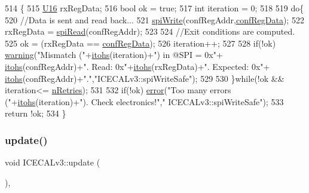 \begin{DoxyCode}
514 \{
515     \hyperlink{ICECALv3_8h_adf928e51a60dba0df29d615401cc55a8}{U16} rxRegData;
516     \textcolor{keywordtype}{bool} ok = \textcolor{keyword}{true};
517     \textcolor{keywordtype}{int} iteration = 0;
518 
519     \textcolor{keywordflow}{do}\{
520         \textcolor{comment}{//Data is sent and read back...}
521         \hyperlink{classICECALv3_aef00f02801dea4bda2093c930501dcdd}{spiWrite}(confRegAddr,\hyperlink{structconfRegData}{confRegData});   
522         rxRegData = \hyperlink{classICECALv3_aced41ce20a0853d6248b8df88412e57a}{spiRead}(confRegAddr);
523 
524         \textcolor{comment}{//Exit conditions are computed.}
525         ok = (rxRegData == \hyperlink{structconfRegData}{confRegData});
526         iteration++;
527     
528         \textcolor{keywordflow}{if}(!ok) \hyperlink{classObject_a65cd4fda577711660821fd2cd5a3b4c9}{warning}(\textcolor{stringliteral}{"Mismatch ("}+\hyperlink{classICECALv3_a04b02e583f191bfce34d05132cd23834}{itohs}(iteration)+\textcolor{stringliteral}{") in @SPI = 0x"}+
      \hyperlink{classICECALv3_a04b02e583f191bfce34d05132cd23834}{itohs}(confRegAddr)+\textcolor{stringliteral}{". Read: 0x"}+\hyperlink{classICECALv3_a04b02e583f191bfce34d05132cd23834}{itohs}(rxRegData)+\textcolor{stringliteral}{". Expected: 0x"}+
      \hyperlink{classICECALv3_a04b02e583f191bfce34d05132cd23834}{itohs}(confRegAddr)+\textcolor{stringliteral}{"."},\textcolor{stringliteral}{"ICECALv3::spiWriteSafe"}); 
529 
530     \}\textcolor{keywordflow}{while}(!ok && iteration<= \hyperlink{classICECALv3_ae877ce34b3a4d6c368cc6409ac9614fa}{nRetries});
531 
532     \textcolor{keywordflow}{if}(!ok) \hyperlink{classObject_a204a95f57818c0f811933917a30eff45}{error}(\textcolor{stringliteral}{"Too many errors ("}+\hyperlink{classICECALv3_a04b02e583f191bfce34d05132cd23834}{itohs}(iteration)+\textcolor{stringliteral}{"). Check electronics!"},\textcolor{stringliteral}{"
      ICECALv3::spiWriteSafe"});
533     \textcolor{keywordflow}{return} !ok;
534 \}
\end{DoxyCode}
\mbox{\label{classICECALv3_ab2a00809e9a4f2ab83ef041a886ca637}} 
\subsubsection{\texorpdfstring{update()}{update()}}
{\footnotesize\ttfamily void I\+C\+E\+C\+A\+Lv3\+::update (\begin{DoxyParamCaption}{ }\end{DoxyParamCaption})\hspace{0.3cm}{\ttfamily [inline]}, {\ttfamily [virtual]}}

